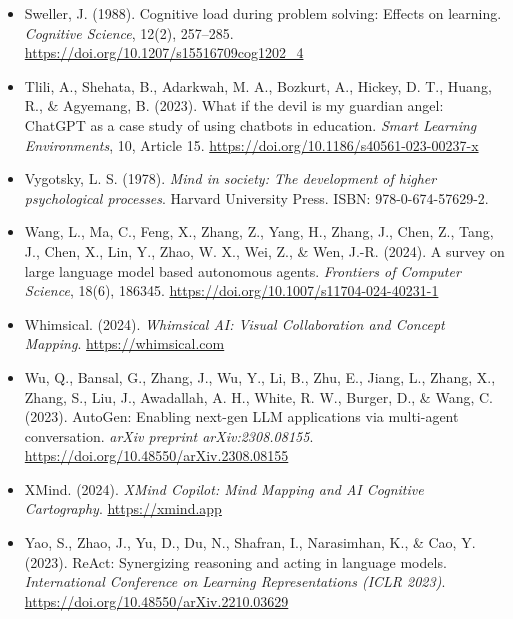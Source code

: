 \begin{itemize}[leftmargin=1.5em, label={}, itemsep=0.22ex, parsep=0pt]
    \item Sweller, J. (1988). Cognitive load during problem solving: Effects on learning. \textit{Cognitive Science}, 12(2), 257--285. \url{https://doi.org/10.1207/s15516709cog1202_4}
    \item Tlili, A., Shehata, B., Adarkwah, M. A., Bozkurt, A., Hickey, D. T., Huang, R., \& Agyemang, B. (2023). What if the devil is my guardian angel: ChatGPT as a case study of using chatbots in education. \textit{Smart Learning Environments}, 10, Article 15. \url{https://doi.org/10.1186/s40561-023-00237-x}
    \item Vygotsky, L. S. (1978). \textit{Mind in society: The development of higher psychological processes}. Harvard University Press. ISBN: 978-0-674-57629-2.
    \item Wang, L., Ma, C., Feng, X., Zhang, Z., Yang, H., Zhang, J., Chen, Z., Tang, J., Chen, X., Lin, Y., Zhao, W. X., Wei, Z., \& Wen, J.-R. (2024). A survey on large language model based autonomous agents. \textit{Frontiers of Computer Science}, 18(6), 186345. \url{https://doi.org/10.1007/s11704-024-40231-1}
    \item Whimsical. (2024). \textit{Whimsical AI: Visual Collaboration and Concept Mapping}. \url{https://whimsical.com}
    \item Wu, Q., Bansal, G., Zhang, J., Wu, Y., Li, B., Zhu, E., Jiang, L., Zhang, X., Zhang, S., Liu, J., Awadallah, A. H., White, R. W., Burger, D., \& Wang, C. (2023). AutoGen: Enabling next-gen LLM applications via multi-agent conversation. \textit{arXiv preprint arXiv:2308.08155}. \url{https://doi.org/10.48550/arXiv.2308.08155}
    \item XMind. (2024). \textit{XMind Copilot: Mind Mapping and AI Cognitive Cartography}. \url{https://xmind.app}
    \item Yao, S., Zhao, J., Yu, D., Du, N., Shafran, I., Narasimhan, K., \& Cao, Y. (2023). ReAct: Synergizing reasoning and acting in language models. \textit{International Conference on Learning Representations (ICLR 2023)}. \url{https://doi.org/10.48550/arXiv.2210.03629}
\end{itemize}
